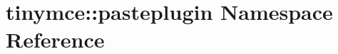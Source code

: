 \hypertarget{namespacetinymce_1_1pasteplugin}{\section{tinymce\+:\+:pasteplugin Namespace Reference}
\label{namespacetinymce_1_1pasteplugin}
}
